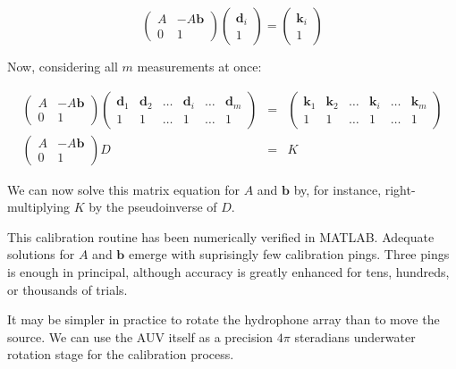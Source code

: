 \documentclass[10pt]{article}
\begin{document}
\begin{equation}
\label{eq:planar-cal-nonsimp}
\left(\begin{array}{cc}
A & -A \mathbf b \\
0 & 1
\end{array}\right)
\left(\begin{array}{c}
\mathbf d_i \\
1
\end{array}\right)
 = 
\left(\begin{array}{c}
\mathbf k_i \\
1
\end{array}\right)
\end{equation}

Now, considering all \(m\) measurements at once:

\begin{eqnarray*}
\label{eq:planar-cAL-simp}
\left(\begin{array}{cc}
A & -A \mathbf b \\
0 & 1
\end{array}\right)
\left(\begin{array}{cccccc}
\mathbf d_1 & \mathbf d_2 & \dots & \mathbf d_i & \dots & \mathbf d_m\\
1 & 1 & \dots & 1 & \dots & 1
\end{array}\right) &=&
\left(\begin{array}{cccccc}
\mathbf k_1 & \mathbf k_2 & \dots & \mathbf k_i & \dots & \mathbf k_m\\
1 & 1 & \dots & 1 & \dots & 1
\end{array}\right) \\
\left(\begin{array}{cc}
A & -A \mathbf b \\
0 & 1
\end{array}\right) D &=& K
\end{eqnarray*}

We can now solve this matrix equation for \(A\) and \(\mathbf b\) by, for instance, right-multiplying \(K\) by the pseudoinverse of \(D\).

This calibration routine has been numerically verified in MATLAB.  Adequate solutions for \(A\) and \(\mathbf b\) emerge with suprisingly few calibration pings.  Three pings is enough in principal, although accuracy is greatly enhanced for tens, hundreds, or thousands of trials.

It may be simpler in practice to rotate the hydrophone array than to move the source.  We can use the AUV itself as a precision \(4 \pi\) steradians underwater rotation stage for the calibration process.
\end{document}
